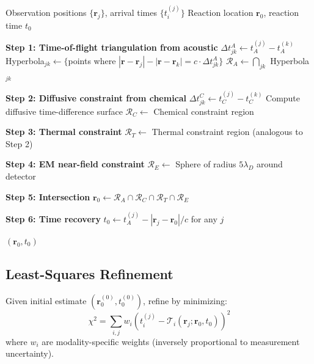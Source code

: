 \documentclass[11pt,a4paper]{article}
\theoremstyle{remark}
\newcommand{\rxnpos}{\mathbf{r}_0}
\newcommand{\rxntime}{t_0}
\newcommand{\obspos}{\mathbf{r}}
\begin{document}
\begin{algorithm}[H]
\caption{Multimodal Reaction Localization}
\label{alg:localization}
\begin{algorithmic}[1]
\Require Observation positions $\{\obspos_j\}$, arrival times $\{t_i^{(j)}\}$
\Ensure Reaction location $\rxnpos$, reaction time $\rxntime$

\State \textbf{Step 1: Time-of-flight triangulation from acoustic}
    \State $\Delta t_{jk}^A \gets t_A^{(j)} - t_A^{(k)}$
    \State Hyperbola$_{jk} \gets \{$points where $|\mathbf{r} - \obspos_j| - |\mathbf{r} - \obspos_k| = c \cdot \Delta t_{jk}^A\}$
\EndFor
\State $\mathcal{R}_A \gets \bigcap_{jk}$ Hyperbola$_{jk}$ 

\State \textbf{Step 2: Diffusive constraint from chemical}
    \State $\Delta t_{jk}^C \gets t_C^{(j)} - t_C^{(k)}$
    \State Compute diffusive time-difference surface
\EndFor
\State $\mathcal{R}_C \gets$ Chemical constraint region

\State \textbf{Step 3: Thermal constraint}
\State $\mathcal{R}_T \gets$ Thermal constraint region (analogous to Step 2)

\State \textbf{Step 4: EM near-field constraint}
\If{any $\obspos_j$ detects EM signal}
    \State $\mathcal{R}_E \gets$ Sphere of radius $5\lambda_D$ around detector
\EndIf

\State \textbf{Step 5: Intersection}
\State $\rxnpos \gets \mathcal{R}_A \cap \mathcal{R}_C \cap \mathcal{R}_T \cap \mathcal{R}_E$

\State \textbf{Step 6: Time recovery}
\State $\rxntime \gets t_A^{(j)} - |\obspos_j - \rxnpos|/c$ for any $j$

\State \Return $(\rxnpos, \rxntime)$
\end{algorithmic}
\end{algorithm}

\subsection{Least-Squares Refinement}

Given initial estimate $(\rxnpos^{(0)}, \rxntime^{(0)})$, refine by minimizing:
\begin{equation}
    \chi^2 = \sum_{i,j} w_i \left(t_i^{(j)} - \mathcal{T}_i(\obspos_j; \rxnpos, \rxntime)\right)^2
\end{equation}
where $w_i$ are modality-specific weights (inversely proportional to measurement uncertainty).
\end{document}

